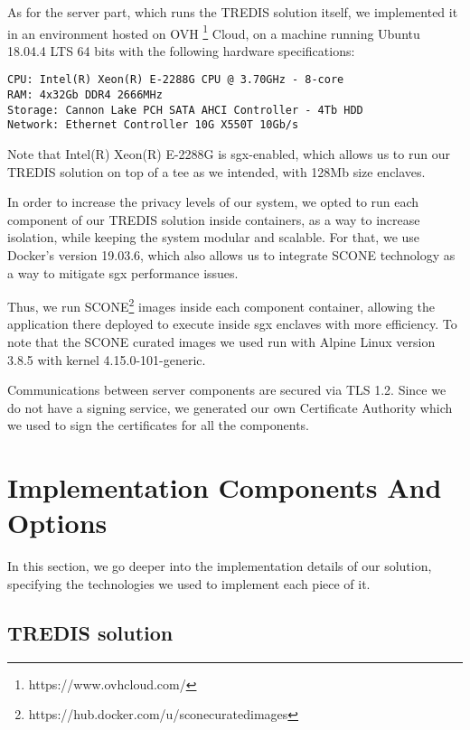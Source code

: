 As for the server part, which runs the TREDIS solution itself, we implemented it in an environment hosted on OVH \footnote{https://www.ovhcloud.com/} Cloud, on a machine running Ubuntu 18.04.4 LTS 64 bits with the following hardware specifications: 
\vspace{5mm}
\begin{lstlisting}
CPU: Intel(R) Xeon(R) E-2288G CPU @ 3.70GHz - 8-core
RAM: 4x32Gb DDR4 2666MHz 
Storage: Cannon Lake PCH SATA AHCI Controller - 4Tb HDD
Network: Ethernet Controller 10G X550T 10Gb/s
\end{lstlisting}
\vspace{3mm}

Note that Intel(R) Xeon(R) E-2288G is \gls{sgx}-enabled, which allows us to run our TREDIS solution on top of a \gls{tee} as we intended, with 128Mb size enclaves. 

In order to increase the privacy levels of our system, we opted to run each component of our TREDIS solution inside containers, as a way to increase isolation, while keeping the system modular and scalable. 
For that, we use Docker's version 19.03.6, which also allows us to integrate SCONE technology as a way to mitigate \gls{sgx} performance issues. 

Thus, we run SCONE\footnote{https://hub.docker.com/u/sconecuratedimages} images  inside each component container, allowing the application there deployed to execute inside \gls{sgx} enclaves with more efficiency. 
To note that the SCONE curated images we used run with Alpine Linux version 3.8.5 with kernel 4.15.0-101-generic.

Communications between server components are secured via TLS 1.2. Since we do not have a signing service, we generated our own Certificate Authority which we used to sign the certificates for all the components. 



\section{Implementation Components And Options}
\label{sec:implementationComponents}

In this section, we go deeper into the implementation details of our solution, specifying the technologies we used to implement each piece of it.


\subsection{TREDIS solution}
\label{ssec:TREDIS_impl_components}

